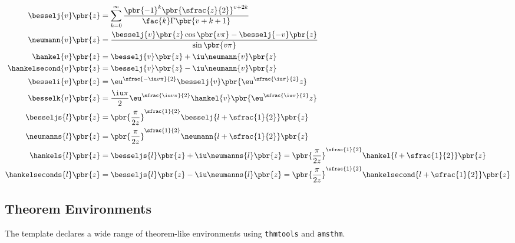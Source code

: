\begin{align*}
    \besselj{v}\pbr{z}                 &= \sum_{k = 0}^\infty \frac{\pbr{-1}^k \pbr{\sfrac{z}{2}}^{v + 2k}}{\fac{k}\Gamma\pbr{v + k + 1}}                                                    \\
    \neumann{v}\pbr{z}                 &= \frac{\besselj{v}\pbr{z}\cos\pbr{v\pi} - \besselj{-v}\pbr{z}}{\sin\pbr{v\pi}}                                                                      \\
    \hankel{v}\pbr{z}                  &= \besselj{v}\pbr{z} + \iu\neumann{v}\pbr{z}                                                                                                         \\
    \hankelsecond{v}\pbr{z}            &= \besselj{v}\pbr{z} - \iu\neumann{v}\pbr{z}                                                                                                         \\
    \besseli{v}\pbr{z}                 &= \eu^{\sfrac{-\iu v\pi}{2}} \besselj{v}\pbr{\eu^{\sfrac{\iu\pi}{2}} z}                                                                              \\
    \besselk{v}\pbr{z}                 &= \frac{\iu\pi}{2} \eu^{\sfrac{\iu v\pi}{2}} \hankel{v}\pbr{\eu^{\sfrac{\iu\pi}{2}} z}                                                               \\
    \besseljs{l}\pbr{z}                &= \pbr{\frac{\pi}{2z}}^{\sfrac{1}{2}} \besselj{l + \sfrac{1}{2}}\pbr{z}                                                                              \\
    \neumanns{l}\pbr{z}                &= \pbr{\frac{\pi}{2z}}^{\sfrac{1}{2}} \neumann{l + \sfrac{1}{2}}\pbr{z}                                                                              \\
    \hankels{l}\pbr{z}                 &= \besseljs{l}\pbr{z} + \iu\neumanns{l}\pbr{z} = \pbr{\frac{\pi}{2z}}^{\sfrac{1}{2}} \hankel{l + \sfrac{1}{2}}\pbr{z}                                \\
    \hankelseconds{l}\pbr{z}           &= \besseljs{l}\pbr{z} - \iu\neumanns{l}\pbr{z} = \pbr{\frac{\pi}{2z}}^{\sfrac{1}{2}} \hankelsecond{l + \sfrac{1}{2}}\pbr{z}
\end{align*}

\subsection{Theorem Environments}

The template declares a wide range of theorem-like environments using \texttt{thmtools} and \texttt{amsthm}.

